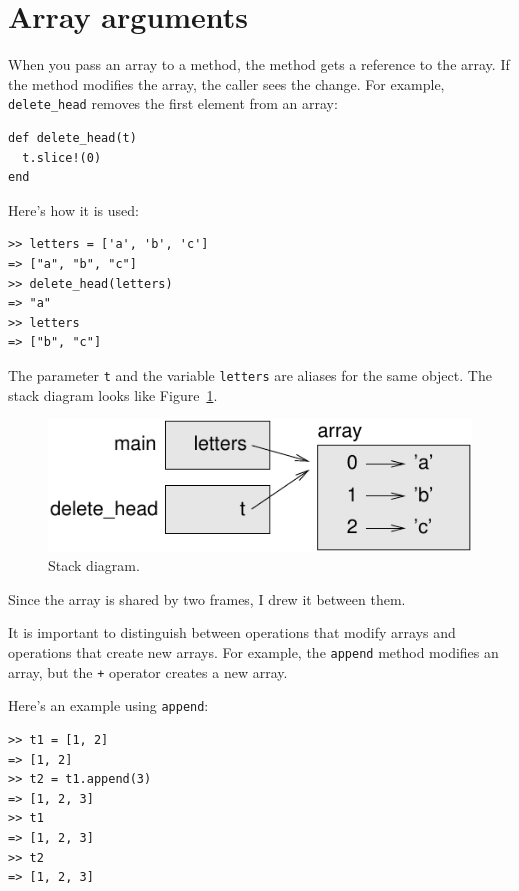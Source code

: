 \documentclass[10pt]{book}
\begin{document}
\section{Array arguments}
\label{array.arguments}

When you pass an array to a method, the method gets a reference to
the array.  If the method modifies the array, the caller sees
the change.  For example, \verb"delete_head" removes the first element
from an array:

\begin{verbatim}
def delete_head(t)
  t.slice!(0)
end
\end{verbatim}
%
Here's how it is used:

\begin{verbatim}
>> letters = ['a', 'b', 'c']
=> ["a", "b", "c"]
>> delete_head(letters)
=> "a"
>> letters
=> ["b", "c"]
\end{verbatim}
%
The parameter {\tt t} and the variable {\tt letters} are
aliases for the same object.  The stack diagram looks like
Figure~\ref{fig.stack5}.

\begin{figure}
\centerline
{\includegraphics[scale=0.8]{figs/stack5.pdf}}
\caption{Stack diagram.}
\label{fig.stack5}
\end{figure}

Since the array is shared by two frames, I drew
it between them.

It is important to distinguish between operations that
modify arrays and operations that create new arrays.  For
example, the {\tt append} method modifies an array, but the
{\tt +} operator creates a new array.

Here's an example using {\tt append}:
%
\begin{verbatim}
>> t1 = [1, 2]
=> [1, 2]
>> t2 = t1.append(3)
=> [1, 2, 3]
>> t1
=> [1, 2, 3]
>> t2
=> [1, 2, 3]
\end{verbatim}
%
\end{document}
